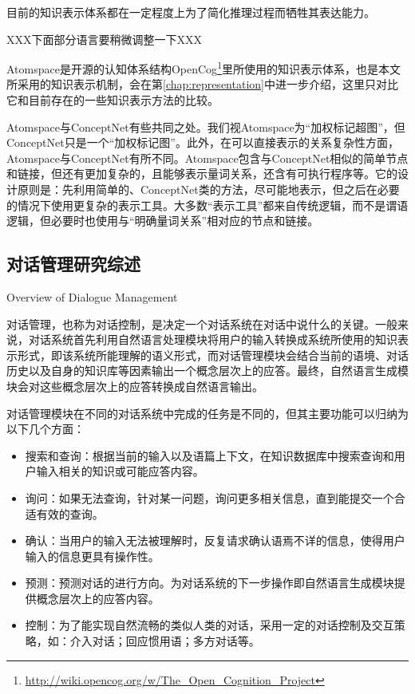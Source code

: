 目前的知识表示体系都在一定程度上为了简化推理过程而牺牲其表达能力。


XXX下面部分语言要稍微调整一下XXX




Atomspace是开源的认知体系结构OpenCog\footnote{\url{http://wiki.opencog.org/w/The_Open_Cognition_Project}}里所使用的知识表示体系，也是本文所采用的知识表示机制，会在第\ref{chap:representation}中进一步介绍，这里只对比它和目前存在的一些知识表示方法的比较。

Atomspace与ConceptNet有些共同之处。我们视Atomspace为“加权标记超图”，但ConceptNet只是一个“加权标记图”。此外，在可以直接表示的关系复杂性方面，Atomspace与ConceptNet有所不同。Atomspace包含与ConceptNet相似的简单节点和链接，但还有更加复杂的，且能够表示量词关系，还含有可执行程序等。它的设计原则是：先利用简单的、ConceptNet类的方法，尽可能地表示，但之后在必要的情况下使用更复杂的表示工具。大多数“表示工具”都来自传统逻辑，而不是谓语逻辑，但必要时也使用与“明确量词关系”相对应的节点和链接。



\subsection{对话管理研究综述}{Overview of Dialogue Management}

对话管理，也称为对话控制，是决定一个对话系统在对话中说什么的关键。一般来说，对话系统首先利用自然语言处理模块将用户的输入转换成系统所使用的知识表示形式，即该系统所能理解的语义形式，而对话管理模块会结合当前的语境、对话历史以及自身的知识库等因素输出一个概念层次上的应答。最终，自然语言生成模块会对这些概念层次上的应答转换成自然语言输出。

对话管理模块在不同的对话系统中完成的任务是不同的，但其主要功能可以归纳为以下几个方面：

\begin{itemize}

\item 搜索和查询：根据当前的输入以及语篇上下文，在知识数据库中搜索查询和用户输入相关的知识或可能应答内容。
\item 询问：如果无法查询，针对某一问题，询问更多相关信息，直到能提交一个合适有效的查询。
\item 确认：当用户的输入无法被理解时，反复请求确认语焉不详的信息，使得用户输入的信息更具有操作性。
\item 预测：预测对话的进行方向。为对话系统的下一步操作即自然语言生成模块提供概念层次上的应答内容。
\item 控制：为了能实现自然流畅的类似人类的对话，采用一定的对话控制及交互策略，如：介入对话；回应惯用语；多方对话等。
\end{itemize}

